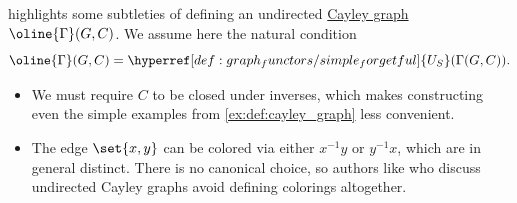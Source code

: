 \begin{remark}\label{rem:undirected_cayley_graph}
   highlights some subtleties of defining an undirected \hyperref[def:cayley_graph]{Cayley graph} \( \oline{\Gamma}(G, C) \). We assume here the natural condition
  \begin{equation*}
    \oline{\Gamma}(G, C) = \hyperref[def:graph_functors/simple_forgetful]{U_S}(\Gamma(G, C)).
  \end{equation*}

  \begin{itemize}
    \item We must require \( C \) to be closed under inverses, which makes constructing even the simple examples from \cref{ex:def:cayley_graph} less convenient.

    \item The edge \( \set{ x, y } \) can be colored via either \( x^{-1} y \) or \( y^{-1} x \), which are in general distinct. There is no canonical choice, so authors like \textcite[def. 2.1.3]{HadelerMüller2017CellularAutomata} who discuss undirected Cayley graphs avoid defining colorings altogether.
  \end{itemize}
\end{remark}

